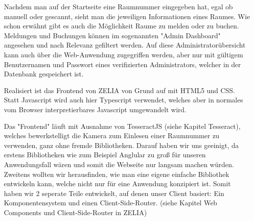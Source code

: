 Nachdem man auf der Startseite eine Raumnummer eingegeben hat, egal ob manuell oder gescannt, sieht man die jeweiligen Informationen eines Raumes. Wie schon erwähnt gibt es auch die Möglichkeit Raume zu melden oder zu buchen. Meldungen und Buchungen können im sogenannten "Admin Dashboard" angesehen und nach Relevanz gefiltert werden. Auf diese Administratorübersicht kann auch über die Web-Anwendung zugegriffen werden, aber nur mit gültigem Benutzernamen und Passwort eines verifizierten Administrators, welcher in der Datenbank gespeichert ist.

Realisiert ist das Frontend von ZELIA von Grund auf mit HTML5 und CSS. Statt Javascript wird auch hier Typescript verwendet, welches aber in normales vom Browser interpretierbares Javascript umgewandelt wird. 

Das "Frontend" läuft mit Ausnahme von TesseractJS (siehe Kapitel Tesseract), welches bewerkstelligt die Kamera zum Einlesen einer Raumnummer zu verwenden, ganz ohne fremde Bibliotheken. Darauf haben wir uns geeinigt, da erstens Bibliotheken wie zum Beispiel Anglular zu groß für unseren Anwendungsfall wären und somit die Webseite nur langsam machen würden. Zweitens wollten wir herausfinden, wie man eine eigene einfache Bibliothek entwickeln kann, welche nicht nur für eine Anwendung konzipiert ist. Somit haben wir 2 seperate Teile entwickelt, auf denen unser Client basiert: Ein Komponentensystem und einen Client-Side-Router. (siehe Kapitel Web Components und Client-Side-Router in ZELIA)